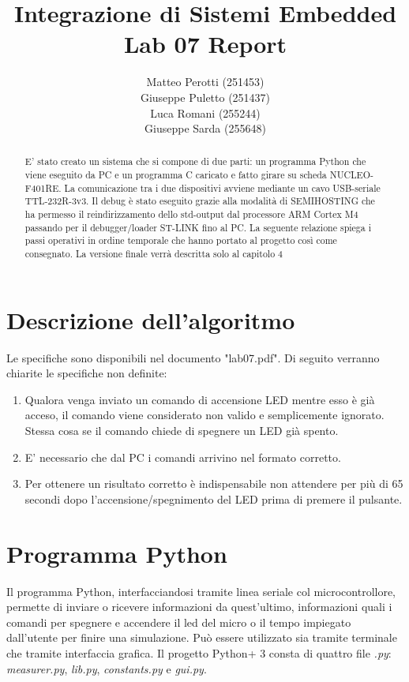 \documentclass[a4paper]{article}
\title{Integrazione di Sistemi Embedded\\Lab 07 Report}
\author{Matteo Perotti (251453)\\Giuseppe Puletto (251437)\\Luca Romani (255244)\\Giuseppe Sarda (255648)}
\begin{document}
\maketitle

\newpage

\begin{abstract}
	E' stato creato un sistema che si compone di due parti: un programma Python che viene eseguito da PC e un programma C caricato e fatto girare su scheda NUCLEO-F401RE. La comunicazione tra i due dispositivi avviene mediante un cavo USB-seriale TTL-232R-3v3. 
	Il debug è stato eseguito grazie alla modalità di SEMIHOSTING che ha permesso il reindirizzamento dello std-output dal processore ARM Cortex M4 passando per il debugger/loader ST-LINK fino al PC.\newline
	La seguente relazione spiega i passi operativi in ordine temporale che hanno portato al progetto così come consegnato. La versione finale verrà descritta solo al capitolo 4
\end{abstract}

\section{Descrizione dell'algoritmo}
Le specifiche sono disponibili nel documento "lab07.pdf". Di seguito verranno chiarite le specifiche non definite:
\begin{enumerate}
	\item Qualora venga inviato un comando di accensione LED mentre esso è già acceso, il comando viene considerato non valido e semplicemente ignorato. Stessa cosa se il comando chiede di spegnere un LED già spento.
	\item E' necessario che dal PC i comandi arrivino nel formato corretto.
	\item Per ottenere un risultato corretto è indispensabile non attendere per più di 65 secondi dopo l'accensione/spegnimento del LED prima di premere il pulsante.
\end{enumerate}

\section{Programma Python}
Il programma Python, interfacciandosi tramite linea seriale col microcontrollore, permette di inviare o ricevere informazioni da quest'ultimo, informazioni quali i comandi per spegnere e accendere il led del micro o il tempo impiegato dall'utente per finire una simulazione. Pu\`{o} essere utilizzato sia tramite terminale che tramite interfaccia grafica. Il progetto Python+
3 consta di quattro file \textit{.py}: \textit{measurer.py}, \textit{lib.py}, \textit{constants.py} e \textit{gui.py}.
\end{document}
